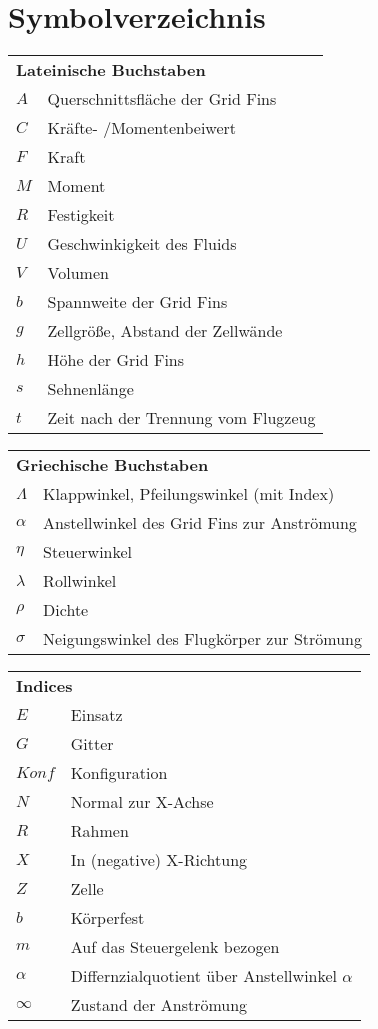 \chapter*{Symbolverzeichnis}						%

\begin{longtable}[l]{ll}
\multicolumn{2}{l}{\textbf{Lateinische Buchstaben}}\\
$A$&Querschnittsfläche der Grid Fins\\
$C$&Kräfte- /Momentenbeiwert\\
$F$&Kraft\\
$M$&Moment\\
$R$&Festigkeit\\
$U$&Geschwinkigkeit des Fluids\\
$V$&Volumen\\
$b$&Spannweite der Grid Fins\\
$g$&Zellgröße, Abstand der Zellwände\\
$h$&Höhe der Grid Fins\\
$s$&Sehnenlänge\\
$t$&Zeit nach der Trennung vom Flugzeug\\
\end{longtable}


\begin{longtable}[l]{ll}
	\multicolumn{2}{l}{\textbf{Griechische Buchstaben}}\\
	$\Lambda$&Klappwinkel, Pfeilungswinkel (mit Index)\\
	$\alpha$&Anstellwinkel des Grid Fins zur Anströmung\\
	$\eta$&Steuerwinkel\\
	$\lambda$&Rollwinkel\\
	$\rho$&Dichte\\
	$\sigma$&Neigungswinkel des Flugkörper zur Strömung\\
\end{longtable}

\begin{longtable}[l]{ll}
	\multicolumn{2}{l}{\textbf{Indices}}\\
	$E$&Einsatz\\
	$G$&Gitter\\
	$Konf$&Konfiguration\\
	$N$&Normal zur X-Achse\\
	$R$&Rahmen\\
	$X$&In (negative) X-Richtung\\
	$Z$&Zelle\\
	$b$&Körperfest\\
	$m$&Auf das Steuergelenk bezogen\\
	$\alpha$&Differnzialquotient über Anstellwinkel $\alpha$\\
	$\infty$&Zustand der Anströmung\\
\end{longtable}

